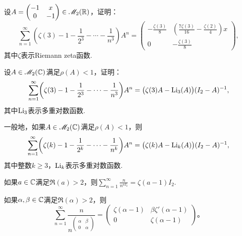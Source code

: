\begin{mybox}
  \begin{problem}
    \begin{inparaenum}[(a)]
      \item 设$A=\begin{pmatrix}
        -1 & x \\
        0 & -1
      \end{pmatrix}\in\mathscr M_2(\mathbb R)$，证明：
      \[
        \sum_{n=1}^\infty \left(\zeta(3) - 1 - \frac1{2^3} - \cdots - \frac1{n^3}\right)A^n =
        \begin{pmatrix}
          -\frac{\zeta(3)}8 & \left(\frac{7\zeta(3)}{16}
          -\frac{\zeta(2)}4\right)x \\
          0 & - \frac{\zeta(3)}8
        \end{pmatrix},
      \]
      其中$\zeta$表示Riemann zeta函数.

      \item 设$A\in\mathscr M_2(\mathbb C)$满足$\rho(A)<1$，证明：
          \[
            \sum_{n=1}^\infty \left(\zeta(3) - 1 - \frac1{2^3} - \cdots - \frac1{n^3}\right)A^n = \big( \zeta(3)A - \Li_3(A) \big)(I_2-A)^{-1},
          \]
      其中$\operatorname{Li}_3$表示多重对数函数.
    \end{inparaenum}
  \end{problem}
\end{mybox}

\begin{remark}
  一般地，如果$A\in\mathscr M_2(\mathbb C)$满足$\rho(A)<1$，则
  \[
    \sum_{n=1}^\infty \left(\zeta(k) - 1 - \frac1{2^k} - \cdots - \frac1{n^k}\right)A^n = \big( \zeta(k)A-\Li_k(A) \big)(I_2-A)^{-1},
  \]
  其中整数$k\ge3$，$\operatorname{Li}_k$表示多重对数函数.
\end{remark}

\begin{problem}
  \begin{inparaenum}[(a)]
    \item 如果$a\in\mathbb C$满足$\Re(a)>2$，则$\sum_{n=1}^\infty\frac n{n^{aI_2}}=\zeta(a-1)I_2$.

    \item 如果$\alpha,\beta\in\mathbb C$满足$\Re(\alpha)>2$，则
        \[
          \sum_{n=1}^\infty \frac n{n^{\begin{pmatrix}
            \alpha & \beta \\
            0 & \alpha
          \end{pmatrix}}} =
          \begin{pmatrix}
            \zeta(\alpha-1) & \beta\zeta'(\alpha-1) \\
            0 & \zeta(\alpha-1)
          \end{pmatrix}。
        \]
  \end{inparaenum}
\end{problem}


